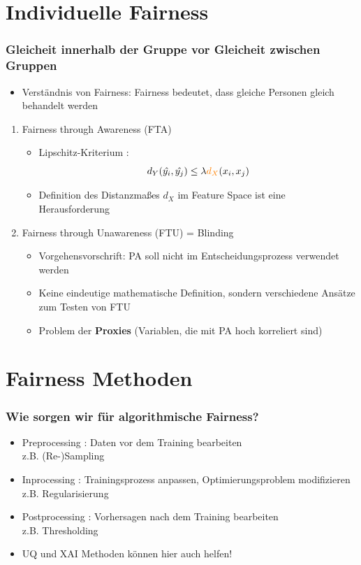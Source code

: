 \documentclass[aspectratio=169]{beamer}
\begin{document}
\section{Individuelle Fairness}
\begin{frame}
    \frametitle{Gleicheit innerhalb der Gruppe vor Gleicheit zwischen Gruppen}
	\begin{itemize}
		\item Verständnis von Fairness: Fairness bedeutet, dass gleiche Personen gleich behandelt werden
	\end{itemize}
    \begin{enumerate}
		\item<2-> Fairness through Awareness \cite{dwork2012} (FTA)
        \begin{itemize}
            \item<3-> Lipschitz-Kriterium \cite{castelnovo2022}:
            \[
            d_Y(\hat{y_i}, \hat{y_j}) \leq \lambda {\color{orange}{d_X}}(x_i, x_j)
            \] 
            \item<4-> Definition des {\color{orange}Distanzmaßes $d_X$} im Feature Space ist eine Herausforderung
        \end{itemize}
        \item<5-> Fairness through Unawareness (FTU) = Blinding
        \begin{itemize}
            \item<6-> Vorgehensvorschrift: PA soll nicht im Entscheidungsprozess verwendet werden
            \item<7-> Keine eindeutige mathematische Definition, sondern verschiedene Ansätze zum Testen von FTU
            \item<8-> Problem der \textbf{Proxies} (Variablen, die mit PA hoch korreliert sind)
        \end{itemize}
    \end{enumerate}
\end{frame}


\section{Fairness Methoden}
\begin{frame}
	\frametitle{Wie sorgen wir für algorithmische Fairness?}
	\begin{itemize}
		\item<1-> Preprocessing \cite{caton2024}: Daten vor dem Training bearbeiten \\ z.B. (Re-)Sampling
		\item<2-> Inprocessing \cite{caton2024}: Trainingsprozess anpassen, Optimierungsproblem modifizieren \\ z.B. Regularisierung
		\item<3-> Postprocessing \cite{caton2024}: Vorhersagen nach dem Training bearbeiten \\ z.B. Thresholding
		\item<4-> UQ und XAI Methoden können hier auch helfen!
	\end{itemize}
\end{frame}
\end{document}
